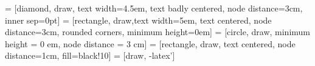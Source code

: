  = [diamond, draw, text width=4.5em, text badly centered, node distance=3cm, inner sep=0pt]
 = [rectangle, draw,text width=5em, text centered, node distance=3cm, rounded corners, minimum height=0em]
 = [circle, draw, minimum height = 0 em, node distance = 3 cm]
 = [rectangle, draw, text centered, node distance=1cm, fill=black!10]
 = [draw, -latex']
    